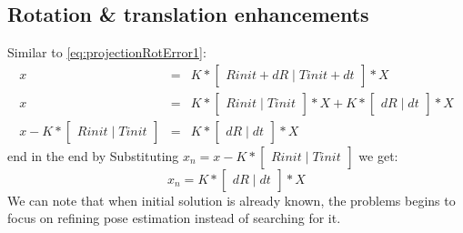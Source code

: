 \subsection{Rotation \& translation enhancements}
Similar to \ref{eq:projectionRotError1}:
\begin{equation} \label{eq:projectionRotError3}
\begin{array}{rcl}
 x & = & K * \begin{bmatrix}Rinit + dR\mid Tinit + dt\end{bmatrix} * X \\
 x & = & K * \begin{bmatrix}Rinit\mid Tinit\end{bmatrix} * X + K * \begin{bmatrix}dR\mid dt\end{bmatrix} * X \\
 x - K * \begin{bmatrix}Rinit\mid Tinit\end{bmatrix} & = & K * \begin{bmatrix}dR\mid dt\end{bmatrix} * X
\end{array}
\end{equation}
end in the end by Substituting $x_{n} = x - K * \begin{bmatrix}Rinit\mid Tinit\end{bmatrix}$ we get: 
\begin{equation} \label{eq:projectionRotError4}
x_{n} = K * \begin{bmatrix}dR\mid dt\end{bmatrix} * X
\end{equation}
We can note that when initial solution is already known, the problems begins to focus on refining pose estimation instead of searching for it.
